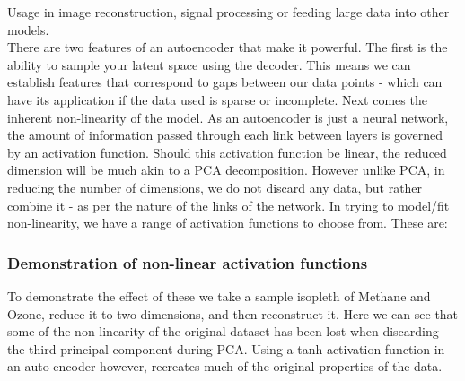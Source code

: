 Usage in image reconstruction, signal processing or feeding large data into other models. \\

There are two features of an autoencoder that make it powerful. The first is the ability to sample your latent space using the decoder. This means we can establish features that correspond to gaps between our data points - which can have its application if the data used is sparse or incomplete. Next comes the inherent non-linearity of the model. As an autoencoder is just a neural network, the amount of information passed through each link between layers is governed by an activation function. Should this activation function be linear, the reduced dimension will be much akin to a PCA decomposition. However unlike PCA, in reducing the number of dimensions, we do not discard any data, but rather combine it - as per the nature of the links of the network. In trying to model/fit non-linearity, we have a range of activation functions to choose from. These are:



\subsubsection{Demonstration of non-linear activation functions}

To demonstrate the effect of these we take a sample isopleth of Methane and Ozone, reduce it to two dimensions, and then reconstruct it. Here we can see that some of the non-linearity of the original dataset has been lost when discarding the third principal component during PCA. Using a tanh activation function in an auto-encoder however, recreates much of the original properties of the data.


